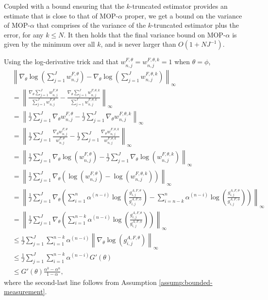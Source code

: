 \documentclass{article}
\begin{document}
Coupled with a bound ensuring that the $k$-truncated estimator provides an estimate that is close to that of MOP-$\alpha$ proper, we get a bound on the variance of MOP-$\alpha$ that comprises of the variance of the $k$-truncated estimator plus the error, for any $k \leq N$. It then holds that the final variance bound on MOP-$\alpha$ is given by the minimum over all $k$, and is never larger than $O(1+NJ^{-1})$. 


Using the log-derivative trick and that $w_{n,j}^{F,\theta} = w_{n,j}^{F,\theta,k} = 1$ when $\theta=\phi$,
\begin{align*}
    &\left\lVert\nabla_\theta\log\left(\sum_{j=1}^J w_{n,j}^{F,\theta}\right)-\nabla_\theta\log\left(\sum_{j=1}^J w_{n,j}^{F,\theta,k}\right)\right\rVert_{\infty}\\
    &= \left\lVert\frac{\nabla_\theta\sum_{j=1}^J w_{n,j}^{F,\theta}}{{\sum_{j=1}^J w_{n,j}^{F,\theta}}}-\frac{\nabla_\theta\sum_{j=1}^J w_{n,j}^{F,\theta,k}}{{\sum_{j=1}^J w_{n,j}^{F,\theta,k}}}\right\rVert_{\infty} \\
    &= \left\lVert\frac{1}{J}\sum_{j=1}^J \nabla_\theta w_{n,j}^{F,\theta}-\frac{1}{J}\sum_{j=1}^J \nabla_\theta w_{n,j}^{F,\theta,k}\right\rVert_{\infty} \\
    &= \left\lVert\frac{1}{J}\sum_{j=1}^J \frac{\nabla_\theta w_{n,j}^{F,\theta}}{w_{n,j}^{F,\theta}}-\frac{1}{J}\sum_{j=1}^J \frac{\nabla_\theta w_{n,j}^{F,\theta,k}}{w_{n,j}^{F,\theta,k}}\right\rVert_{\infty} \\
    &= \left\lVert\frac{1}{J}\sum_{j=1}^J \nabla_\theta \log\left(w_{n,j}^{F,\theta}\right)-\frac{1}{J}\sum_{j=1}^J \nabla_\theta \log\left(w_{n,j}^{F,\theta,k}\right)\right\rVert_{\infty} \\
    &= \left\lVert\frac{1}{J}\sum_{j=1}^J \nabla_\theta \left(\log\left(w_{n,j}^{F,\theta}\right)-\log\left(w_{n,j}^{F,\theta,k}\right)\right)\right\rVert_{\infty}\\
    &= \left\lVert\frac{1}{J}\sum_{j=1}^J \nabla_\theta \left(\sum_{i=1}^n\alpha^{(n-i)}\log\left(\frac{g_{i,j}^{A,F,\theta}}{g_{i,j}^{A,F,\phi}} \right) - \sum_{i=n-k}^n{\alpha^{(n-i)}}\log\left(\frac{g_{i,j}^{A,F,\theta}}{g_{i,j}^{A,F,\phi}} \right)\right)\right\rVert_{\infty} \\
    &= \left\lVert\frac{1}{J}\sum_{j=1}^J \nabla_\theta \left(\sum_{i=1}^{n-k}\alpha^{(n-i)}\log\left(\frac{g_{i,j}^{A,F,\theta}}{g_{i,j}^{A,F,\phi}} \right) \right)\right\rVert_{\infty}\\
    &\leq \frac{1}{J}\sum_{j=1}^J \sum_{i=1}^{n-k}\alpha^{(n-i)}\left\lVert\nabla_\theta\log\left(g_{i,j}^{A,F,\theta} \right)\right\rVert_{\infty}\\
    &\leq \frac{1}{J}\sum_{j=1}^J \sum_{i=1}^{n-k}\alpha^{(n-i)}G'(\theta)\\
    &\leq G'(\theta)\frac{\alpha^k-\alpha^n}{1-\alpha},
\end{align*}
where the second-last line follows from Assumption \ref{assump:bounded-measurement}.
\end{document}
